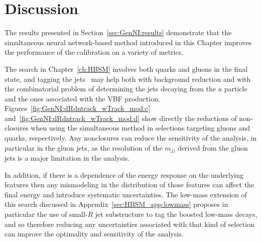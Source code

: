 
\FloatBarrier

\section{Discussion}
\label{sec:GenNI:discussion}
The results presented in Section~\ref{sec:GenNI:results} demonstrate that the simultaneous neural network-based method introduced in this Chapter improves the performance of the calibration on a variety of metrics.

The search in Chapter~\ref{ch:HBSM} involves both quarks and gluons in the final state, and tagging the jets~\cite{ATL-PHYS-PUB-2017-009,Aad:2014gea,ATLAS-CONF-2016-034,ATL-PHYS-PUB-2017-017} may help both with background reduction and with the combinatorial problem of determining the jets decaying from the $a$ particle and the ones associated with the VBF production.
Figures~\ref{fig:GenNI:dRdntrack_wTrack_mod:c} and~\ref{fig:GenNI:dRdntrack_wTrack_mod:d} show directly the reductions of non-closures when using the simultaneous method in selections targeting gluons and quarks, respectively.
Any nonclosures can reduce the sensitivity of the analysis, in particular in the gluon jets, as the resolution of the $m_{jj}$ derived from the gluon jets is a major limitation in the analysis.

In addition, if there is a dependence of the energy response on the underlying features then any mismodeling in the distribution of those features can affect the final energy and introduce systematic uncertainties.
The low-mass extension of this search discussed in Appendix~\ref{sec:HBSM_app:lowmass} proposes in particular the use of small-$R$ jet substructure to tag the boosted low-mass decays, and so therefore reducing any uncertainties associated with that kind of selection can improve the optimality and sensitivity of the analysis.

